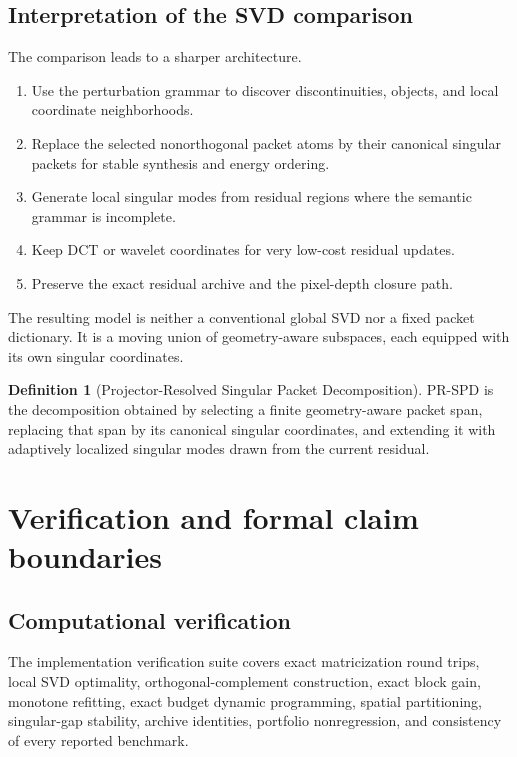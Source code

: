\documentclass[11pt]{article}
\theoremstyle{definition}
\newtheorem{definition}[theorem]{Definition}
\theoremstyle{remark}
\begin{document}
\FloatBarrier
\subsection{Interpretation of the SVD comparison}
The comparison leads to a sharper architecture.

\begin{enumerate}
\item Use the perturbation grammar to discover discontinuities, objects, and local coordinate neighborhoods.
\item Replace the selected nonorthogonal packet atoms by their canonical singular packets for stable synthesis and energy ordering.
\item Generate local singular modes from residual regions where the semantic grammar is incomplete.
\item Keep DCT or wavelet coordinates for very low-cost residual updates.
\item Preserve the exact residual archive and the pixel-depth closure path.
\end{enumerate}

The resulting model is neither a conventional global SVD nor a fixed packet dictionary. It is a moving union of geometry-aware subspaces, each equipped with its own singular coordinates.

\begin{definition}[Projector-Resolved Singular Packet Decomposition]
PR-SPD is the decomposition obtained by selecting a finite geometry-aware packet span, replacing that span by its canonical singular coordinates, and extending it with adaptively localized singular modes drawn from the current residual.
\end{definition}

\FloatBarrier
\FloatBarrier
\section{Verification and formal claim boundaries}
\subsection{Computational verification}
The implementation verification suite covers exact matricization round trips, local SVD optimality, orthogonal-complement construction, exact block gain, monotone refitting, exact budget dynamic programming, spatial partitioning, singular-gap stability, archive identities, portfolio nonregression, and consistency of every reported benchmark.
\end{document}
